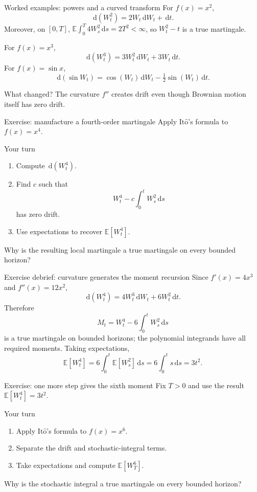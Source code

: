 \documentclass[handout,10pt,aspectratio=169]{beamer}
\newcommand{\E}{\mathbb E}
\newcommand{\dd}{\,\mathrm d}
\newcommand{\Ito}{\mathrm{It\hat{o}}}
\begin{document}
\begin{frame}{Worked examples: powers and a curved transform}
For \(f(x)=x^2\),
\[
\boxed{\dd(W_t^2)=2W_t\dd W_t+\dd t.}
\]
Moreover, on \([0,T]\),
\(
\E\int_0^T4W_s^2\dd s=2T^2<\infty
\), so \(W_t^2-t\) is a true martingale.

For \(f(x)=x^3\),
\[
\boxed{\dd(W_t^3)=3W_t^2\dd W_t+3W_t\dd t.}
\]
For \(f(x)=\sin x\),
\[
\boxed{\dd(\sin W_t)=\cos(W_t)\dd W_t-\tfrac12\sin(W_t)\dd t.}
\]
\begin{block}{What changed?}
The curvature \(f''\) creates drift even though Brownian motion itself has zero drift.
\end{block}
\end{frame}

\begin{frame}{Exercise: manufacture a fourth-order martingale}
Apply \(\Ito\)'s formula to \(f(x)=x^4\).
\begin{block}{Your turn}
\begin{enumerate}\setlength{\itemsep}{0.55em}
  \item Compute \(\dd(W_t^4)\).
  \item Find \(c\) such that
  \[
  W_t^4-c\int_0^tW_s^2\dd s
  \]
  has zero drift.
  \item Use expectations to recover \(\E[W_t^4]\).
\end{enumerate}
\end{block}
Why is the resulting local martingale a true martingale on every bounded horizon?
\end{frame}

\begin{frame}{Exercise debrief: curvature generates the moment recursion}
Since \(f'(x)=4x^3\) and \(f''(x)=12x^2\),
\[
\dd(W_t^4)=4W_t^3\dd W_t+6W_t^2\dd t.
\]
Therefore
\[
\boxed{M_t=W_t^4-6\int_0^tW_s^2\dd s}
\]
is a true martingale on bounded horizons; the polynomial integrands have all required moments. Taking expectations,
\[
\E[W_t^4]
=6\int_0^t\E[W_s^2]\dd s
=6\int_0^ts\dd s
=3t^2.
\]
\end{frame}

\begin{frame}{Exercise: one more step gives the sixth moment}
Fix \(T>0\) and use the result \(\E[W_t^4]=3t^2\).
\begin{block}{Your turn}
\begin{enumerate}\setlength{\itemsep}{0.55em}
  \item Apply \(\Ito\)'s formula to \(f(x)=x^6\).
  \item Separate the drift and stochastic-integral terms.
  \item Take expectations and compute \(\E[W_T^6]\).
\end{enumerate}
\end{block}
Why is the stochastic integral a true martingale on every bounded horizon?
\end{frame}
\end{document}
